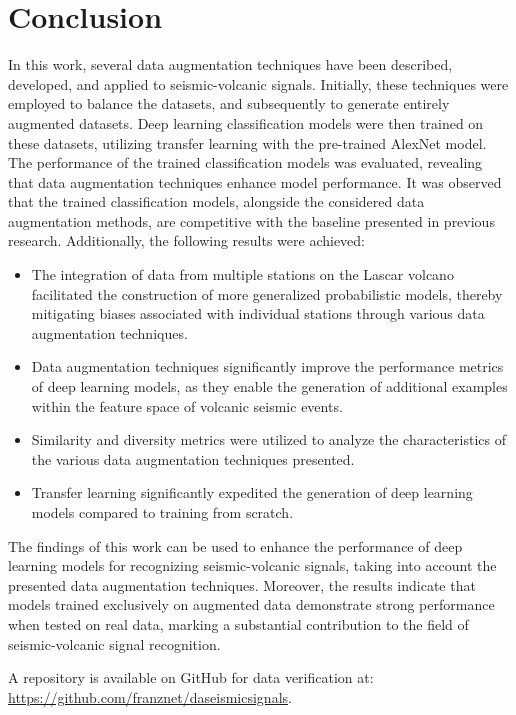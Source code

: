 \documentclass[journal]{IEEEtran}
\begin{document}
\section{Conclusion} \label{conclusion}
In this work, several data augmentation techniques have been described, developed, and applied to seismic-volcanic signals. Initially, these techniques were employed to balance the datasets, and subsequently to generate entirely augmented datasets. Deep learning classification models were then trained on these datasets, utilizing transfer learning with the pre-trained AlexNet model.
The performance of the trained classification models was evaluated, revealing that data augmentation techniques enhance model performance.
It was observed that the trained classification models, alongside the considered data augmentation methods, are competitive with the baseline presented in previous research. Additionally, the following results were achieved:
\begin{itemize} \item The integration of data from multiple stations on the Lascar volcano facilitated the construction of more generalized probabilistic models, thereby mitigating biases associated with individual stations through various data augmentation techniques.
\item Data augmentation techniques significantly improve the performance metrics of deep learning models, as they enable the generation of additional examples within the feature space of volcanic seismic events.
\item Similarity and diversity metrics were utilized to analyze the characteristics of the various data augmentation techniques presented.
\item Transfer learning significantly expedited the generation of deep learning models compared to training from scratch. 
\end{itemize}
The findings of this work can be used to enhance the performance of deep learning models for recognizing seismic-volcanic signals, taking into account the presented data augmentation techniques. Moreover, the results indicate that models trained exclusively on augmented data demonstrate strong performance when tested on real data, marking a substantial contribution to the field of seismic-volcanic signal recognition.

A repository is available on GitHub for data verification at: \href{https://github.com/franznet/daseismicsignals}{\color{blue}https://github.com/franznet/daseismicsignals}.
\end{document}
